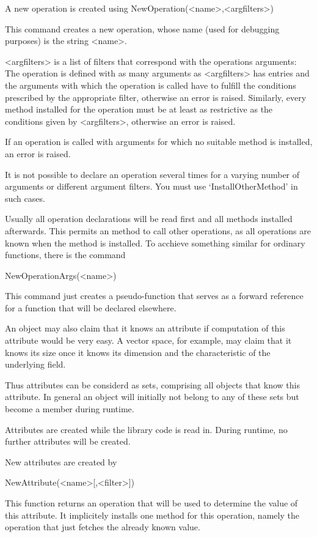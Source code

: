 A new operation is created using
\>NewOperation(<name>,<argfilters>)

This command creates a new operation, whose name (used for debugging
purposes) is the string <name>.

<argfilters> is a list of filters that correspond with the operations
arguments: The operation is defined with as many arguments as <argfilters> has
entries and the arguments with which the operation is called have to fulfill
the conditions prescribed by the appropriate filter, otherwise an error is
raised. Similarly, every method installed for the operation must be at least
as restrictive as the conditions given by <argfilters>, otherwise an error
is raised.

If an operation is called with arguments for which no suitable method
is installed, an error is raised.

\danger
It is not possible to declare an operation several times for a varying
number of arguments or different argument filters. You must use
`InstallOtherMethod' in such cases.


Usually all operation declarations will be read first and all methods
installed afterwards. This permits an method to call other operations, as
all operations are known when the method is installed. To acchieve something
similar for ordinary functions, there is the command

\>NewOperationArgs(<name>)

This command just creates a pseudo-function that serves as a forward
reference for a function that will be declared elsewhere.



\danger
An object may also claim that it knows an attribute if computation of this
attribute would be very easy. A vector space, for example, may claim that
it knows its size once it knows its dimension and the characteristic of the
underlying field. 

Thus attributes can be considerd as sets, comprising all objects that know
this attribute. In general an object will initially not belong to any of
these sets but become a member during runtime.

\danger
Attributes are created while the library code is read in. During runtime, no
further attributes will be created.

New attributes are created by

\>NewAttribute(<name>[,<filter>])

This function returns an operation that will be used to determine the value
of this attribute. It implicitely installs one method for this operation,
namely the operation that just fetches the already known value.

